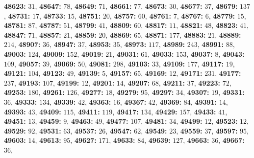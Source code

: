 \textsf{\bfseries 48623:} $31$, \textsf{\bfseries 48647:} $78$, \textsf{\bfseries 48649:} $71$, \textsf{\bfseries 48661:} $77$, \textsf{\bfseries 48673:} $30$, \textsf{\bfseries 48677:} $37$, \textsf{\bfseries 48679:} $137$, \textsf{\bfseries 48731:} $17$, \textsf{\bfseries 48733:} $15$, \textsf{\bfseries 48751:} $20$, \textsf{\bfseries 48757:} $60$, \textsf{\bfseries 48761:} $7$, \textsf{\bfseries 48767:} $6$, \textsf{\bfseries 48779:} $15$, \textsf{\bfseries 48781:} $87$, \textsf{\bfseries 48787:} $51$, \textsf{\bfseries 48799:} $41$, \textsf{\bfseries 48809:} $60$, \textsf{\bfseries 48817:} $11$, \textsf{\bfseries 48821:} $48$, \textsf{\bfseries 48823:} $41$, \textsf{\bfseries 48847:} $71$, \textsf{\bfseries 48857:} $21$, \textsf{\bfseries 48859:} $20$, \textsf{\bfseries 48869:} $65$, \textsf{\bfseries 48871:} $177$, \textsf{\bfseries 48883:} $21$, \textsf{\bfseries 48889:} $214$, \textsf{\bfseries 48907:} $36$, \textsf{\bfseries 48947:} $37$, \textsf{\bfseries 48953:} $35$, \textsf{\bfseries 48973:} $117$, \textsf{\bfseries 48989:} $243$, \textsf{\bfseries 48991:} $88$, \textsf{\bfseries 49003:} $124$, \textsf{\bfseries 49009:} $152$, \textsf{\bfseries 49019:} $21$, \textsf{\bfseries 49031:} $61$, \textsf{\bfseries 49033:} $153$, \textsf{\bfseries 49037:} $8$, \textsf{\bfseries 49043:} $109$, \textsf{\bfseries 49057:} $39$, \textsf{\bfseries 49069:} $50$, \textsf{\bfseries 49081:} $298$, \textsf{\bfseries 49103:} $33$, \textsf{\bfseries 49109:} $177$, \textsf{\bfseries 49117:} $19$, \textsf{\bfseries 49121:} $104$, \textsf{\bfseries 49123:} $49$, \textsf{\bfseries 49139:} $5$, \textsf{\bfseries 49157:} $65$, \textsf{\bfseries 49169:} $12$, \textsf{\bfseries 49171:} $231$, \textsf{\bfseries 49177:} $237$, \textsf{\bfseries 49193:} $107$, \textsf{\bfseries 49199:} $12$, \textsf{\bfseries 49201:} $14$, \textsf{\bfseries 49207:} $68$, \textsf{\bfseries 49211:} $37$, \textsf{\bfseries 49223:} $72$, \textsf{\bfseries 49253:} $180$, \textsf{\bfseries 49261:} $126$, \textsf{\bfseries 49277:} $18$, \textsf{\bfseries 49279:} $95$, \textsf{\bfseries 49297:} $34$, \textsf{\bfseries 49307:} $19$, \textsf{\bfseries 49331:} $36$, \textsf{\bfseries 49333:} $134$, \textsf{\bfseries 49339:} $42$, \textsf{\bfseries 49363:} $16$, \textsf{\bfseries 49367:} $42$, \textsf{\bfseries 49369:} $84$, \textsf{\bfseries 49391:} $14$, \textsf{\bfseries 49393:} $43$, \textsf{\bfseries 49409:} $115$, \textsf{\bfseries 49411:} $119$, \textsf{\bfseries 49417:} $134$, \textsf{\bfseries 49429:} $157$, \textsf{\bfseries 49433:} $41$, \textsf{\bfseries 49451:} $13$, \textsf{\bfseries 49459:} $9$, \textsf{\bfseries 49463:} $49$, \textsf{\bfseries 49477:} $107$, \textsf{\bfseries 49481:} $34$, \textsf{\bfseries 49499:} $12$, \textsf{\bfseries 49523:} $12$, \textsf{\bfseries 49529:} $92$, \textsf{\bfseries 49531:} $63$, \textsf{\bfseries 49537:} $26$, \textsf{\bfseries 49547:} $62$, \textsf{\bfseries 49549:} $23$, \textsf{\bfseries 49559:} $37$, \textsf{\bfseries 49597:} $95$, \textsf{\bfseries 49603:} $14$, \textsf{\bfseries 49613:} $95$, \textsf{\bfseries 49627:} $171$, \textsf{\bfseries 49633:} $84$, \textsf{\bfseries 49639:} $127$, \textsf{\bfseries 49663:} $36$, \textsf{\bfseries 49667:} $36$, 
